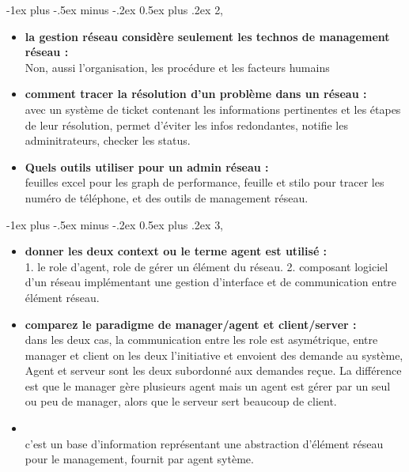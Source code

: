 \documentclass[12pt,landscape]{article}
\makeatletter
\renewcommand{\section}{\@startsection{section}{1}{0mm}%
                                {-1ex plus -.5ex minus -.2ex}%
                                {0.5ex plus .2ex}%
                                {\normalfont\large\bfseries}}
\makeatother
\begin{document}
\begin{multicols}{2}
\begin{enumerate}
\end{enumerate}
\section{2, }
\begin{itemize}
 \item \textbf{la gestion réseau considère seulement les technos de management réseau : }\\
 Non, aussi l'organisation, les procédure et les facteurs humains
 
 \item \textbf{comment tracer la résolution d'un problème dans un réseau : }\\
 avec un système de ticket contenant les informations pertinentes et les étapes de leur résolution, permet d'éviter les infos redondantes, notifie les adminitrateurs, checker les status.
 
 \item \textbf{Quels outils utiliser pour un admin réseau :}\\
 feuilles excel pour les graph de performance, feuille et stilo pour tracer les numéro de téléphone, et des outils de management réseau.
 
\end{itemize}


\section{3, }

\begin{itemize}
 \item \textbf{donner les deux context ou le terme agent est utilisé :}\\
 1. le role d'agent, role de gérer un élément du réseau. 2. composant logiciel d'un réseau implémentant une gestion d'interface et de communication entre élément réseau.
 
 \item \textbf{comparez le paradigme de manager/agent et client/server : }\\
 dans les deux cas, la communication entre les role est asymétrique, entre manager et client on les deux l'initiative et envoient des demande au système, Agent et serveur sont les deux subordonné aux demandes reçue. La différence est que le manager gère plusieurs agent mais un agent est gérer par un seul ou peu de manager, alors que le serveur sert beaucoup de client.
 
 \item {}\\
 c'est un base d'information représentant une abstraction d'élément réseau pour le management, fournit par agent sytème.
 

\end{itemize}
\end{multicols}
\end{document}
